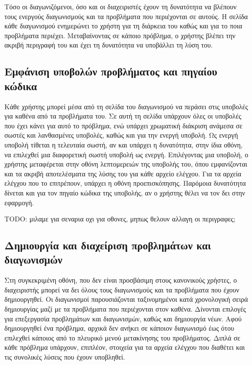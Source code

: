 \documentclass[diploma]{softlab-thesis}
\begin{document}
Τόσο οι διαγωνιζόμενοι, όσο και οι διαχειριστές έχουν τη δυνατότητα να βλέπουν
τους ενεργούς διαγωνισμούς και τα προβλήματα που περιέχονται σε αυτούς. Η
σελίδα κάθε διαγωνισμού ενημερώνει το χρήστη για τη διάρκεια του καθώς και για
το ποια προβλήματα περιέχει. Μεταβαίνοντας σε κάποιο πρόβλημα, ο χρήστης βλέπει
την ακριβή περιγραφή του και έχει τη δυνατότητα να υποβάλλει τη λύση του.

\subsection{Εμφάνιση υποβολών προβλήματος και πηγαίου κώδικα}

Κάθε χρήστης μπορεί μέσα από τη σελίδα του διαγωνισμού να περάσει στις υποβολές
για καθένα από τα προβλήματα του. Σε αυτή τη σελίδα υπάρχουν όλες οι υποβολές
που έχει κάνει για αυτό το πρόβλημα, ενώ υπάρχει χρωματική διάκριση ανάμεσα σε
σωστές και λανθασμένες υποβολές, καθώς και για την ενεργή υποβολή. Ως ενεργή
υποβολή τίθεται η τελευταία σωστή, αν και υπάρχει η δυνατότητα, στην ίδια
οθόνη, να επιλεχθεί μια διαφορετική σωστή υποβολή ως ενεργή. Επιλέγοντας μια
υποβολή, ο χρήστης μεταφέρεται στην οθόνη λεπτομερειών της υποβολής του, όπου
εμφανίζονται και τα ακριβή αποτελέσματα της λύσης του για κάθε αρχείο ελέγχου.
Για τα αρχεία ελέγχου που το επιτρέπουν, υπάρχει η οθόνη προεπισκόπησης.
Παρόμοια δυνατότητα δίνεται και για τον πηγαίο κώδικα της υποβολής, αν ο
χρήστης θέλει να τον δει στην εφαρμογή.

TODO: μιλαμε για σεναρια οχι για οθονες, μηπως θελουν αλλαγη οι περιγραφες;
\subsection{Δημιουργία και διαχείριση προβλημάτων και διαγωνισμών}

Στη συγκεκριμένη οθόνη, που δεν είναι προσβάσιμη στους κανονικούς χρήστες, ο
διαχειριστής μπορεί να δει όλους τους διαγωνισμούς και τα προβλήματα που έχουν
δημιουργηθεί. Οι διαγωνισμοί παρουσιάζονται ταξινομημένοι κατά χρονολογική
σειρά δημιουργίας μαζί με τα προβλήματα που περιέχονται στον καθένα. Δίνονται
επιλογές για επεξεργασία προβλημάτων και διαγωνισμών, καθώς και δημιουργία
νέων. Αφού δημιουργηθεί ένα πρόβλημα, αρχικά δεν ανήκει σε κάποιον διαγωνισμό
έως ότου επιλεχθεί κάποιος από το πλευρικό μενού μετακίνησης του προβλήματος.
Διπλά σε κάθε πρόβλημα υπάρχουν, επιπλέον, στοιχεία για τα αρχεία ελέγχου που
διαθέτει και τις συνολικές λύσεις που έχουν υποβληθεί.

\bigskip
\end{document}
